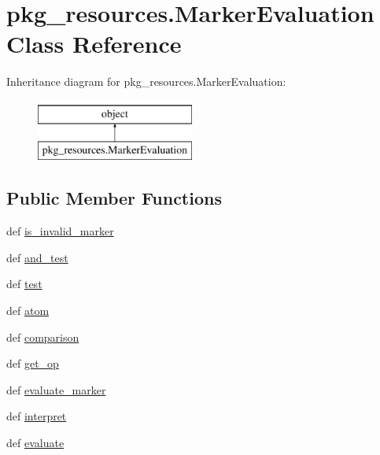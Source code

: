\hypertarget{classpkg__resources_1_1MarkerEvaluation}{}\section{pkg\+\_\+resources.\+Marker\+Evaluation Class Reference}
\label{classpkg__resources_1_1MarkerEvaluation}
Inheritance diagram for pkg\+\_\+resources.\+Marker\+Evaluation\+:\begin{figure}[H]
\begin{center}
\leavevmode
\includegraphics[height=2.000000cm]{classpkg__resources_1_1MarkerEvaluation}
\end{center}
\end{figure}
\subsection*{Public Member Functions}
\begin{DoxyCompactItemize}
\item 
def \hyperlink{classpkg__resources_1_1MarkerEvaluation_a17f4d9547243c02d90238b5f3b3ac134}{is\+\_\+invalid\+\_\+marker}
\item 
def \hyperlink{classpkg__resources_1_1MarkerEvaluation_ac75d63992642d11fe25a963b6612bbab}{and\+\_\+test}
\item 
def \hyperlink{classpkg__resources_1_1MarkerEvaluation_ad33abd6df9ba62b5e79f4dab04d78d7e}{test}
\item 
def \hyperlink{classpkg__resources_1_1MarkerEvaluation_a228ec84f0d9ed7c83d8255eefaed81ac}{atom}
\item 
def \hyperlink{classpkg__resources_1_1MarkerEvaluation_aec287249c2389508b5ed2c6a0262002d}{comparison}
\item 
def \hyperlink{classpkg__resources_1_1MarkerEvaluation_ac9bbd6b3e64b30722d57097f038ff117}{get\+\_\+op}
\item 
def \hyperlink{classpkg__resources_1_1MarkerEvaluation_a4e9a6e8415618f4040085e57e7e12153}{evaluate\+\_\+marker}
\item 
def \hyperlink{classpkg__resources_1_1MarkerEvaluation_a389b6c6e156502afff7877421bc9b376}{interpret}
\item 
def \hyperlink{classpkg__resources_1_1MarkerEvaluation_a1aaa8fa51232857d4d12d15ea0a4a72e}{evaluate}
\end{DoxyCompactItemize}

